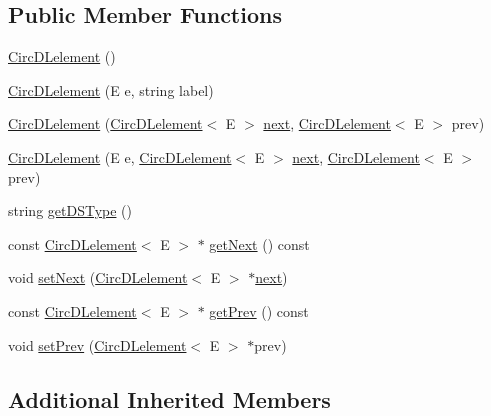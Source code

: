 \subsection*{Public Member Functions}
\begin{DoxyCompactItemize}
\item 
\hyperlink{classbridges_1_1_circ_d_lelement_a35279302f5fb5297eeb6efead475921e}{Circ\+D\+Lelement} ()
\item 
\hyperlink{classbridges_1_1_circ_d_lelement_a7dc1ad0eca7c06678064789303c522ed}{Circ\+D\+Lelement} (E e, string label)
\item 
\hyperlink{classbridges_1_1_circ_d_lelement_a9d0cf8a5b60e3fedc1ba1ad792570934}{Circ\+D\+Lelement} (\hyperlink{classbridges_1_1_circ_d_lelement}{Circ\+D\+Lelement}$<$ E $>$ \hyperlink{classbridges_1_1_s_lelement_ad7449d10a09ebc52653a7baed812aa43}{next}, \hyperlink{classbridges_1_1_circ_d_lelement}{Circ\+D\+Lelement}$<$ E $>$ prev)
\item 
\hyperlink{classbridges_1_1_circ_d_lelement_a2e729cd481f11c51bb5b686b8072ec8c}{Circ\+D\+Lelement} (E e, \hyperlink{classbridges_1_1_circ_d_lelement}{Circ\+D\+Lelement}$<$ E $>$ \hyperlink{classbridges_1_1_s_lelement_ad7449d10a09ebc52653a7baed812aa43}{next}, \hyperlink{classbridges_1_1_circ_d_lelement}{Circ\+D\+Lelement}$<$ E $>$ prev)
\item 
string \hyperlink{classbridges_1_1_circ_d_lelement_a2f0a5ad8b1207a11968ea7227e6fd0ef}{get\+D\+S\+Type} ()
\item 
const \hyperlink{classbridges_1_1_circ_d_lelement}{Circ\+D\+Lelement}$<$ E $>$ $\ast$ \hyperlink{classbridges_1_1_circ_d_lelement_ad02db972b2a525de01855bfed1a45ea4}{get\+Next} () const
\item 
void \hyperlink{classbridges_1_1_circ_d_lelement_a0bdf28de82173f2099673d18f6f62810}{set\+Next} (\hyperlink{classbridges_1_1_circ_d_lelement}{Circ\+D\+Lelement}$<$ E $>$ $\ast$\hyperlink{classbridges_1_1_s_lelement_ad7449d10a09ebc52653a7baed812aa43}{next})
\item 
const \hyperlink{classbridges_1_1_circ_d_lelement}{Circ\+D\+Lelement}$<$ E $>$ $\ast$ \hyperlink{classbridges_1_1_circ_d_lelement_a8a1aa2f979094bccf2cca2ca31f0373d}{get\+Prev} () const
\item 
void \hyperlink{classbridges_1_1_circ_d_lelement_a5b2a0dad47208829bb2c17d8bc0ee74d}{set\+Prev} (\hyperlink{classbridges_1_1_circ_d_lelement}{Circ\+D\+Lelement}$<$ E $>$ $\ast$prev)
\end{DoxyCompactItemize}
\subsection*{Additional Inherited Members}


